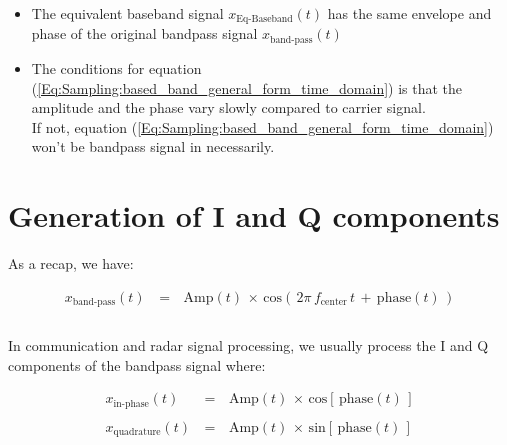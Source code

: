 \documentclass[12pt,a4paper]{book}
\begin{document}
\begin{enumerate}
\begin{itemize}
	\item The equivalent baseband signal $x_{\text{Eq-Baseband}}(t)$ has the same envelope and phase of the original bandpass signal $x_{\text{band-pass}}(t)$ 	
	
	\item The conditions for equation (\ref{Eq:Sampling:based_band_general_form_time_domain}) is that the amplitude and the phase vary slowly compared to carrier signal. \\
	
	If not, equation (\ref{Eq:Sampling:based_band_general_form_time_domain}) won't be bandpass signal in necessarily.
	\end{itemize}

\end{enumerate}

\section{Generation of I and Q components}




As a recap, we have:

\begin{equation}
\begin{array}{rcl}
x_{\text{band-pass}}(t) \, &=&\, \text{Amp}(t) \, \times \, \text{cos}\left(\, 2 \pi \, f_{\text{center}} \, t \, + \, \text{phase}(t) \,\right)\\ \\
\end{array}
\label{Eq:Sampling:based_band_general_form_time_domain_recap}
\end{equation}


In communication and radar signal processing, we usually process the I and Q components of the bandpass signal where:

\begin{equation}
\begin{array}{rcl}
x_{\text{in-phase}}(t) \, &=& \, \text{Amp}(t) \, \times \, \text{cos}\left[\, \text{phase}(t) \, \right] \\ \\
x_{\text{quadrature}}(t) \, &=& \, \text{Amp}(t) \, \times \, \text{sin}\left[\, \text{phase}(t) \, \right] \\ \\
\end{array}
\label{Eq:Sampling:inpahse_quadrature_signals}
\end{equation}
\end{document}
